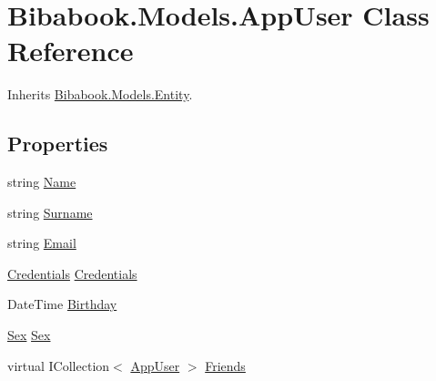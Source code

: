 \hypertarget{class_bibabook_1_1_models_1_1_app_user}{}\section{Bibabook.\+Models.\+App\+User Class Reference}
\label{class_bibabook_1_1_models_1_1_app_user}


Inherits \hyperlink{class_bibabook_1_1_models_1_1_entity}{Bibabook.\+Models.\+Entity}.

\subsection*{Properties}
\begin{DoxyCompactItemize}
\item 
string \hyperlink{class_bibabook_1_1_models_1_1_app_user_aee57e30c2750473ba7327beb843c460d}{Name}
\item 
string \hyperlink{class_bibabook_1_1_models_1_1_app_user_aac165e3467b1c5ac86c5c4972107f952}{Surname}
\item 
string \hyperlink{class_bibabook_1_1_models_1_1_app_user_ae88c5f30604127c23a4ae2bdf3015009}{Email}
\item 
\hyperlink{class_bibabook_1_1_models_1_1_credentials}{Credentials} \hyperlink{class_bibabook_1_1_models_1_1_app_user_a2f332a8cab99553e9fe9158c38180283}{Credentials}
\item 
Date\+Time \hyperlink{class_bibabook_1_1_models_1_1_app_user_a134b30cd39e6c90f421e5bb4b860bca0}{Birthday}
\item 
\hyperlink{namespace_contract_1_1_enums_aabaa9dcad8ec43294f16c7ec913b5db3}{Sex} \hyperlink{class_bibabook_1_1_models_1_1_app_user_a2130ea655fc647a8331fe0d17bc48808}{Sex}
\item 
virtual I\+Collection$<$ \hyperlink{class_bibabook_1_1_models_1_1_app_user}{App\+User} $>$ \hyperlink{class_bibabook_1_1_models_1_1_app_user_a53cdc07d5bb00e65d8541c8bf9cecf9e}{Friends}

\end{DoxyCompactItemize}
